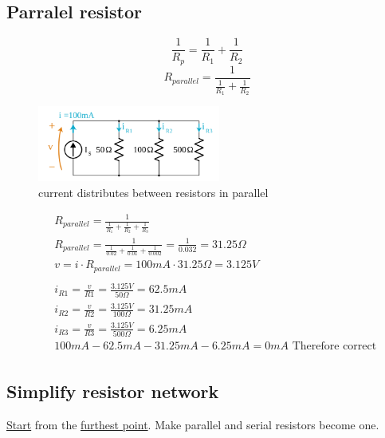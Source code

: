 \newpage
\subsection{Parralel resistor}
\begin{equation} \frac{1}{R_p} = \frac{1}{R_1} + \frac{1}{R_2} \end{equation}
\begin{equation} R_{parallel} = \frac{1}{\frac{1}{R_1} + \frac{1}{R_2}} \end{equation}

\begin{figure}[h]
    \vspace{10mm}
    \centering
    \includegraphics[width=6cm]{image/current-distributes-between-resistors-in-parallel.png}
    \caption{current distributes between resistors in parallel}
\end{figure}

\begin{align*}
  &\quad R_{parallel} = \frac{1}{\frac{1}{R_1} + \frac{1}{R_2} + \frac{1}{R_3}} \\
  &\quad R_{parallel} = \frac{1}{\frac{1}{0.02} + \frac{1}{0.01} + \frac{1}{0.002}} =
  \frac{1}{0.032} = 31.25\Omega \\
  &\quad v=i\cdot{R_{parallel}} = 100mA\cdot{31.25\Omega} = 3.125V \\
  &\quad \\
  &\quad i_{R1} = \frac{v}{R1} = \frac{3.125V}{50\Omega} = 62.5mA \\
  &\quad i_{R2} = \frac{v}{R2} = \frac{3.125V}{100\Omega} = 31.25mA \\
  &\quad i_{R3} = \frac{v}{R3} = \frac{3.125V}{500\Omega} = 6.25mA \\
  &\quad 100mA -62.5mA -31.25mA -6.25mA = 0mA \text{ Therefore correct }\\
\end{align*}


\subsection{Simplify resistor network}
\underline{Start} from the \underline{furthest point}. Make parallel and serial resistors become one.

